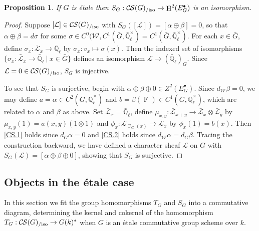 \documentclass[10pt]{amsart}
\theoremstyle{plain}
\newtheorem{proposition}[theorem]{Proposition}
\theoremstyle{definition}
\newtheorem{remark}[theorem]{Remark}
\newcommand{\EE}{\mathbb{\bar Q}_\ell}
\newcommand{\Fq}{k}
\newcommand{\EEx}{\EE^\times}
\newcommand{\Weil}[1]{\mathcal{W}_{#1}}
\newcommand{\Frob}[1]{\operatorname{F}_{#1}}
\DeclareMathOperator{\Hh}{H}
\newcommand{\tq}{{\ \vert\ }}
\newcommand{\TrFrob}[1]{T_{#1}}
\newcommand{\cs}[1]{{\mathcal{#1}}}
\newcommand{\gcs}[1]{{\mathcal{\bar #1}}}
\newcommand{\CS}{{\mathcal{C\hskip-0.8pt S}}}
\newcommand{\CSiso}[1]{\CS(#1)_{/\text{iso}}}
\newcommand{\bG}{\bar{G}}
\begin{document}

\begin{proposition}\label{prop:SGiso}
If $G$ is \'etale then $S_G:  \CSiso{G} \to \Hh^2(E^\bullet_G)$ is an isomorphism.
\end{proposition}
\begin{proof}
Suppose $[\cs{L}] \in \CSiso{G}$ with $S_G([\cs{L}]) = [\alpha \oplus \beta] = 0$,
so that $\alpha \oplus \beta = d\sigma$ for some $\sigma \in C^0(\Weil{},C^1(\bG,\EEx) = C^1(\bG,\EEx)$.
For each $x\in \bG$, define $\sigma_x : \gcs{L}_x \to \EE$ by $\sigma_x : v_x \mapsto \sigma(x)$.
Then the indexed set of isomorphisms $\{ \sigma_x : \gcs{L}_x \to \EE \tq x\in \bG\}$
defines an isomorphism $\cs{L} \to (\EE)_G$.
Since $\cs{L} = 0 \in \CSiso{G}$, $S_G$ is injective.

To see that $S_G$ is surjective, begin with $\alpha\oplus\beta\oplus 0 \in Z^2(E^\bullet_G)$.
Since $d_{\Weil{}} \beta = 0$, we may define $a = \alpha \in C^2(\bG,\EEx)$ and
$b = \beta(\Frob{}) \in C^1(\bG,\EEx)$, which are related to $\alpha$ and $\beta$ as above.
Set $\gcs{L}_x = \EE$, define $\mu_{x,y} : \gcs{L}_{x+y} \to \gcs{L}_x\otimes\gcs{L}_y$
by $\mu_{x,y}(1) = a(x,y) (1\otimes 1)$ and $\phi_x : \gcs{L}_{\Frob{G}(x)} \to \gcs{L}_x$ by $\phi_x(1)= b(x)$.
Then \ref{CS.1} holds since $d_G \alpha =0$ and \ref{CS.2} holds since $d_{\Weil{}}\alpha =d_G \beta$.
Tracing the construction backward, we have defined a character sheaf $\cs{L}$ on $G$ with
$S_G(\cs{L}) = [\alpha\oplus\beta\oplus 0]$, showing that $S_G$ is surjective.
\end{proof}


\subsection{Objects in the \'etale case}\label{ssec:SandT}

In this section we fit the group homomorphisms $\TrFrob{G}$ and $S_G$ into a commutative diagram, determining the kernel and cokernel of the homomorphism $\TrFrob{G} : \CSiso{G} \to G(k)^*$ when $G$ is an \'etale commutative group scheme over $\Fq$.
\end{document}

